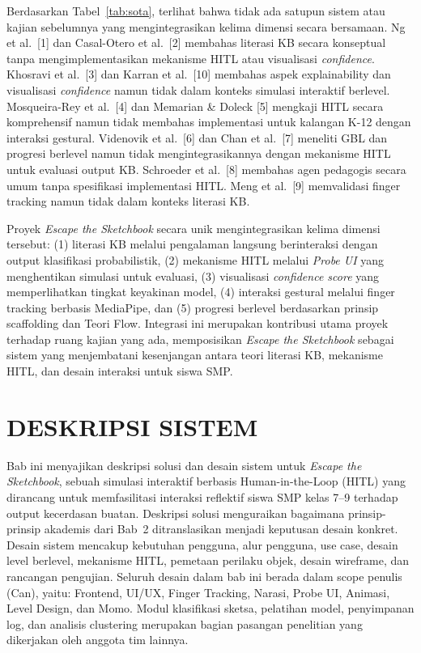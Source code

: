 \documentclass[12pt,oneside]{report}
\begin{document}
Berdasarkan Tabel~\ref{tab:sota}, terlihat bahwa tidak ada satupun sistem atau kajian sebelumnya yang mengintegrasikan kelima dimensi secara bersamaan. Ng et al.\ [1] dan Casal-Otero et al.\ [2] membahas literasi KB secara konseptual tanpa mengimplementasikan mekanisme HITL atau visualisasi \textit{confidence}. Khosravi et al.\ [3] dan Karran et al.\ [10] membahas aspek explainability dan visualisasi \textit{confidence} namun tidak dalam konteks simulasi interaktif berlevel. Mosqueira-Rey et al.\ [4] dan Memarian \& Doleck [5] mengkaji HITL secara komprehensif namun tidak membahas implementasi untuk kalangan K-12 dengan interaksi gestural. Videnovik et al.\ [6] dan Chan et al.\ [7] meneliti GBL dan progresi berlevel namun tidak mengintegrasikannya dengan mekanisme HITL untuk evaluasi output KB. Schroeder et al.\ [8] membahas agen pedagogis secara umum tanpa spesifikasi implementasi HITL. Meng et al.\ [9] memvalidasi finger tracking namun tidak dalam konteks literasi KB.

Proyek \textit{Escape the Sketchbook} secara unik mengintegrasikan kelima dimensi tersebut: (1) literasi KB melalui pengalaman langsung berinteraksi dengan output klasifikasi probabilistik, (2) mekanisme HITL melalui \textit{Probe UI} yang menghentikan simulasi untuk evaluasi, (3) visualisasi \textit{confidence score} yang memperlihatkan tingkat keyakinan model, (4) interaksi gestural melalui finger tracking berbasis MediaPipe, dan (5) progresi berlevel berdasarkan prinsip scaffolding dan Teori Flow. Integrasi ini merupakan kontribusi utama proyek terhadap ruang kajian yang ada, memposisikan \textit{Escape the Sketchbook} sebagai sistem yang menjembatani kesenjangan antara teori literasi KB, mekanisme HITL, dan desain interaksi untuk siswa SMP.


\chapter{DESKRIPSI SISTEM}
\label{chap:bab3}

Bab ini menyajikan deskripsi solusi dan desain sistem untuk \textit{Escape the Sketchbook}, sebuah simulasi interaktif berbasis Human-in-the-Loop (HITL) yang dirancang untuk memfasilitasi interaksi reflektif siswa SMP kelas 7--9 terhadap output kecerdasan buatan. Deskripsi solusi menguraikan bagaimana prinsip-prinsip akademis dari Bab~2 ditranslasikan menjadi keputusan desain konkret. Desain sistem mencakup kebutuhan pengguna, alur pengguna, use case, desain level berlevel, mekanisme HITL, pemetaan perilaku objek, desain wireframe, dan rancangan pengujian. Seluruh desain dalam bab ini berada dalam scope penulis (Can), yaitu: Frontend, UI/UX, Finger Tracking, Narasi, Probe UI, Animasi, Level Design, dan Momo. Modul klasifikasi sketsa, pelatihan model, penyimpanan log, dan analisis clustering merupakan bagian pasangan penelitian yang dikerjakan oleh anggota tim lainnya.
\end{document}
